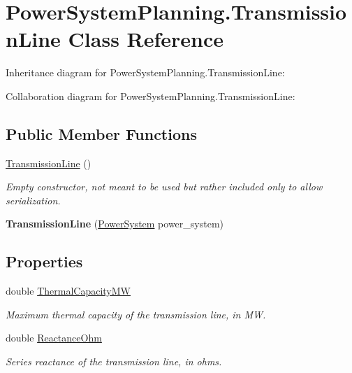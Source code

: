 \hypertarget{class_power_system_planning_1_1_transmission_line}{}\section{Power\+System\+Planning.\+Transmission\+Line Class Reference}
\label{class_power_system_planning_1_1_transmission_line}


Inheritance diagram for Power\+System\+Planning.\+Transmission\+Line\+:


Collaboration diagram for Power\+System\+Planning.\+Transmission\+Line\+:
\subsection*{Public Member Functions}
\begin{DoxyCompactItemize}
\item 
\hyperlink{class_power_system_planning_1_1_transmission_line_a6031223d4ebe71e02ee01908b92f4789}{Transmission\+Line} ()
\begin{DoxyCompactList}\small\item\em Empty constructor, not meant to be used but rather included only to allow serialization. \end{DoxyCompactList}\item 
{\bfseries Transmission\+Line} (\hyperlink{class_power_system_planning_1_1_power_system}{Power\+System} power\+\_\+system)\hypertarget{class_power_system_planning_1_1_transmission_line_a077143e93db30e381298931ba0fbd3dc}{}\label{class_power_system_planning_1_1_transmission_line_a077143e93db30e381298931ba0fbd3dc}

\end{DoxyCompactItemize}
\subsection*{Properties}
\begin{DoxyCompactItemize}
\item 
double \hyperlink{class_power_system_planning_1_1_transmission_line_a0b11d55d8f8c39bb3f49133f02091f3c}{Thermal\+Capacity\+MW}
\begin{DoxyCompactList}\small\item\em Maximum thermal capacity of the transmission line, in MW. \end{DoxyCompactList}\item 
double \hyperlink{class_power_system_planning_1_1_transmission_line_acaa88f661cda6aa13361691f2409f3ef}{Reactance\+Ohm}
\begin{DoxyCompactList}\small\item\em Series reactance of the transmission line, in ohms. \end{DoxyCompactList}\end{DoxyCompactItemize}
